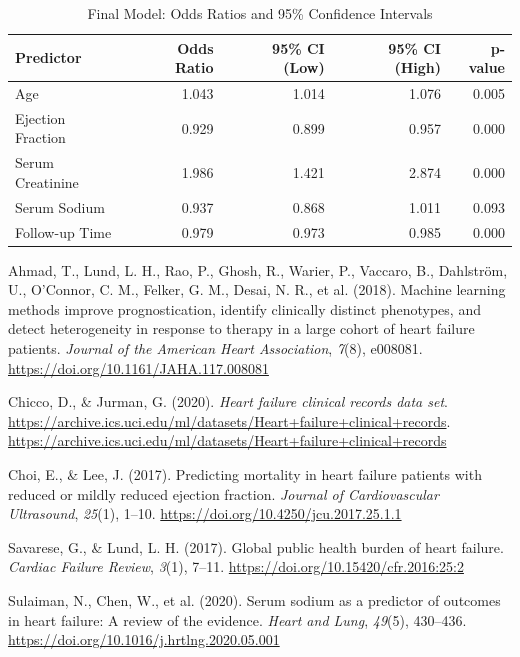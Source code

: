 \documentclass[
  letterpaper,
  DIV=11,
  numbers=noendperiod]{scrartcl}
\newlength{\cslhangindent}
\newlength{\cslentryspacingunit} %
\newenvironment{CSLReferences}[2] %
 {%
  \setlength{\parindent}{0pt}
  \ifodd #1
  \let\oldpar\par
  \def\par{\hangindent=\cslhangindent\oldpar}
  \fi
  \setlength{\parskip}{#2\cslentryspacingunit}
 }%
 {}
\begin{document}
\begin{longtable}[t]{lrrrr}
\caption{Final Model: Odds Ratios and 95\% Confidence Intervals}\\
\toprule
Predictor & Odds Ratio & 95\% CI (Low) & 95\% CI (High) & p-value\\
\midrule
Age & 1.043 & 1.014 & 1.076 & 0.005\\
Ejection Fraction & 0.929 & 0.899 & 0.957 & 0.000\\
Serum Creatinine & 1.986 & 1.421 & 2.874 & 0.000\\
Serum Sodium & 0.937 & 0.868 & 1.011 & 0.093\\
Follow-up Time & 0.979 & 0.973 & 0.985 & 0.000\\
\bottomrule
\end{longtable}

\hypertarget{refs}{}
\begin{CSLReferences}{1}{0}
\leavevmode{}%
Ahmad, T., Lund, L. H., Rao, P., Ghosh, R., Warier, P., Vaccaro, B.,
Dahlström, U., O'Connor, C. M., Felker, G. M., Desai, N. R., et al.
(2018). Machine learning methods improve prognostication, identify
clinically distinct phenotypes, and detect heterogeneity in response to
therapy in a large cohort of heart failure patients. \emph{Journal of
the American Heart Association}, \emph{7}(8), e008081.
\url{https://doi.org/10.1161/JAHA.117.008081}

\leavevmode{}%
Chicco, D., \& Jurman, G. (2020). \emph{Heart failure clinical records
data set}.
\url{https://archive.ics.uci.edu/ml/datasets/Heart+failure+clinical+records}.
\url{https://archive.ics.uci.edu/ml/datasets/Heart+failure+clinical+records}

\leavevmode{}%
Choi, E., \& Lee, J. (2017). Predicting mortality in heart failure
patients with reduced or mildly reduced ejection fraction. \emph{Journal
of Cardiovascular Ultrasound}, \emph{25}(1), 1--10.
\url{https://doi.org/10.4250/jcu.2017.25.1.1}

\leavevmode{}%
Savarese, G., \& Lund, L. H. (2017). Global public health burden of
heart failure. \emph{Cardiac Failure Review}, \emph{3}(1), 7--11.
\url{https://doi.org/10.15420/cfr.2016:25:2}

\leavevmode{}%
Sulaiman, N., Chen, W., et al. (2020). Serum sodium as a predictor of
outcomes in heart failure: A review of the evidence. \emph{Heart and
Lung}, \emph{49}(5), 430--436.
\url{https://doi.org/10.1016/j.hrtlng.2020.05.001}

\end{CSLReferences}
\end{document}
